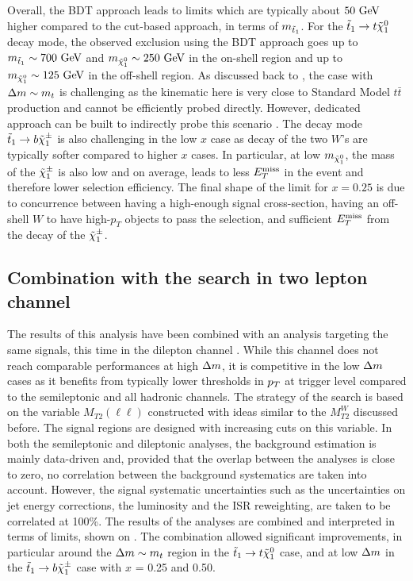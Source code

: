     Overall, the BDT approach leads to limits which are typically about $50~\text{GeV}$ higher
    compared to the cut-based approach, in terms of $m_{\tilde{t}_1}$. For the $\tilde{t}_1
    \rightarrow t \tilde{\chi}_1^0$ decay mode, the observed exclusion using the BDT approach
    goes up to $m_{\tilde{t}_1} \sim 700~\text{GeV}$ and $m_{\tilde{\chi}_1^0} \sim 250~\text{GeV}$ in the
    on-shell region and up to $m_{\tilde{\chi}_1^0} \sim 125~\text{GeV}$ in the off-shell region.
    As discussed back to , the case with $\Delta m \sim
    m_{t}$ is challenging as the kinematic here is very close to Standard Model $t\bar{t}$
    production and cannot be efficiently probed directly. However, dedicated approach can
    be built to indirectly probe this scenario \cite{SUS-13-021, ClosingStopGap}. The
    decay mode $\tilde{t}_1 \rightarrow b \tilde{\chi}_1^\pm$ is also challenging in the low $x$ case
    as decay of the two $W$'s are typically softer compared to higher $x$ cases. In
    particular, at low $m_{\tilde{\chi}_1^0}$, the mass of the $\tilde{\chi}_1^\pm$ is also low and
    on average, leads to less $E_T^\text{miss}$ in the event and therefore lower selection efficiency. The final shape
    of the limit for $x = 0.25$ is due to concurrence between having a high-enough signal cross-section,
    having an off-shell $W$ to have high-$p_T$ objects to pass the selection, and
    sufficient $E_T^\text{miss}$ from the decay of the $\tilde{\chi}_1^\pm$.

    \subsection{Combination with the search in two lepton channel}

    The results of this analysis have been combined with an analysis targeting the same
    signals, this time in the dilepton channel \cite{stopDilepton}. While this channel does not reach
    comparable performances at high $\Delta m$, it is competitive in the low $\Delta m$ cases
    as it benefits from typically lower thresholds in $p_T$ at trigger level compared to
    the semileptonic and all hadronic
    channels. The strategy of the search is based on the variable $M_{T2}(\ell\ell)$ constructed
    with ideas similar to the $M_{T2}^W$ discussed before. The signal regions are designed
    with increasing cuts on this variable. In both the semileptonic and dileptonic analyses,
    the background estimation is mainly data-driven and, provided that the overlap between
    the analyses is close to zero, no correlation between the background systematics are
    taken into account. However, the signal systematic uncertainties such as the uncertainties
    on jet energy corrections, the luminosity and the ISR reweighting, are taken to
    be correlated at 100\%. The results of the analyses are combined and interpreted
    in terms of limits, shown on . The combination allowed
    significant improvements, in particular around the $\Delta m \sim m_{t}$ region
    in the $\tilde{t}_1 \rightarrow t \tilde{\chi}_1^0$ case, and at low $\Delta m$ in the
    $\tilde{t}_1 \rightarrow b \tilde{\chi}_1^\pm$ case with $x$ = 0.25 and 0.50.

